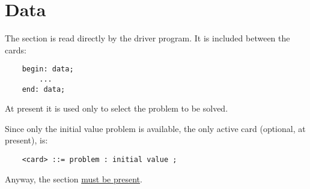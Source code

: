 %
%
%
%
%
% 
%
%

\chapter{Data}\label{sec:DATA}
The  section is read directly by the driver program. It is
included between the cards:
\begin{verbatim}
    begin: data;
        ...
    end: data;
\end{verbatim}
At present it is used only to select the problem to be solved.

Since only the initial value problem is available, the only active 
card (optional, at present), is:
\begin{verbatim}
    <card> ::= problem : initial value ;
\end{verbatim}
Anyway, the  section \underline{must be present}.

